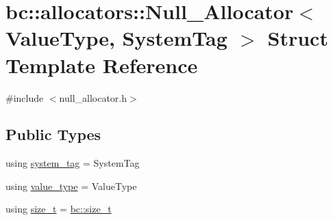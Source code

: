 \hypertarget{structbc_1_1allocators_1_1Null__Allocator}{}\section{bc\+:\+:allocators\+:\+:Null\+\_\+\+Allocator$<$ Value\+Type, System\+Tag $>$ Struct Template Reference}
\label{structbc_1_1allocators_1_1Null__Allocator}


{\ttfamily \#include $<$null\+\_\+allocator.\+h$>$}

\subsection*{Public Types}
\begin{DoxyCompactItemize}
\item 
using \hyperlink{structbc_1_1allocators_1_1Null__Allocator_a5accbd7634ecdda0a5dbf54c28815e9e}{system\+\_\+tag} = System\+Tag
\item 
using \hyperlink{structbc_1_1allocators_1_1Null__Allocator_ac6562bbd777fc64599fdc6720f093815}{value\+\_\+type} = Value\+Type
\item 
using \hyperlink{structbc_1_1allocators_1_1Null__Allocator_a24ad862d692b0676b201e15a3d18b53e}{size\+\_\+t} = \hyperlink{namespacebc_aaf8e3fbf99b04b1b57c4f80c6f55d3c5}{bc\+::size\+\_\+t}
\end{DoxyCompactItemize}
